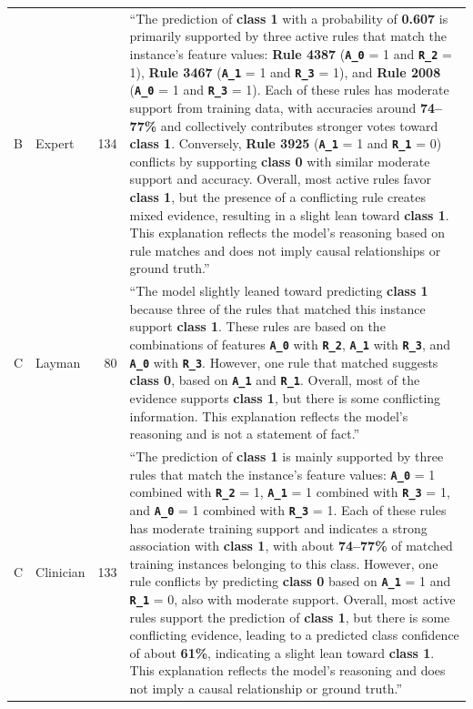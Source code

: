 \documentclass[sigconf,nonacm]{acmart}
\begin{document}
\begin{table}[t]
\begin{tabular}{p{1.6cm}p{1.4cm}r p{11.0cm}}
B & Expert & 134 & ``The prediction of \textbf{class 1} with a probability of \textbf{0.607} is primarily supported by three active rules that match the instance's feature values: \textbf{Rule 4387} (\texttt{\textbf{A\_0}} = 1 and \texttt{\textbf{R\_2}} = 1), \textbf{Rule 3467} (\texttt{\textbf{A\_1}} = 1 and \texttt{\textbf{R\_3}} = 1), and \textbf{Rule 2008} (\texttt{\textbf{A\_0}} = 1 and \texttt{\textbf{R\_3}} = 1). Each of these rules has moderate support from training data, with accuracies around \textbf{74--77\%} and collectively contributes stronger votes toward \textbf{class 1}. Conversely, \textbf{Rule 3925} (\texttt{\textbf{A\_1}} = 1 and \texttt{\textbf{R\_1}} = 0) conflicts by supporting \textbf{class 0} with similar moderate support and accuracy. Overall, most active rules favor \textbf{class 1}, but the presence of a conflicting rule creates mixed evidence, resulting in a slight lean toward \textbf{class 1}. This explanation reflects the model's reasoning based on rule matches and does not imply causal relationships or ground truth.'' \\
C & Layman & 80 & ``The model slightly leaned toward predicting \textbf{class 1} because three of the rules that matched this instance support \textbf{class 1}. These rules are based on the combinations of features \texttt{\textbf{A\_0}} with \texttt{\textbf{R\_2}}, \texttt{\textbf{A\_1}} with \texttt{\textbf{R\_3}}, and \texttt{\textbf{A\_0}} with \texttt{\textbf{R\_3}}. However, one rule that matched suggests \textbf{class 0}, based on \texttt{\textbf{A\_1}} and \texttt{\textbf{R\_1}}. Overall, most of the evidence supports \textbf{class 1}, but there is some conflicting information. This explanation reflects the model's reasoning and is not a statement of fact.'' \\
C & Clinician & 133 & ``The prediction of \textbf{class 1} is mainly supported by three rules that match the instance's feature values: \texttt{\textbf{A\_0}} = 1 combined with \texttt{\textbf{R\_2}} = 1, \texttt{\textbf{A\_1}} = 1 combined with \texttt{\textbf{R\_3}} = 1, and \texttt{\textbf{A\_0}} = 1 combined with \texttt{\textbf{R\_3}} = 1. Each of these rules has moderate training support and indicates a strong association with \textbf{class 1}, with about \textbf{74--77\%} of matched training instances belonging to this class. However, one rule conflicts by predicting \textbf{class 0} based on \texttt{\textbf{A\_1}} = 1 and \texttt{\textbf{R\_1}} = 0, also with moderate support. Overall, most active rules support the prediction of \textbf{class 1}, but there is some conflicting evidence, leading to a predicted class confidence of about \textbf{61\%}, indicating a slight lean toward \textbf{class 1}. This explanation reflects the model's reasoning and does not imply a causal relationship or ground truth.'' \\

\end{tabular}
\end{table}
\end{document}
